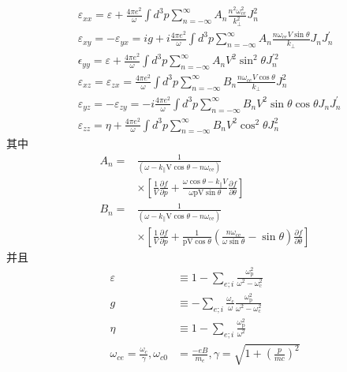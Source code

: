 \begin{subequations}\label{eq:disper}
\begin{align}
&\varepsilon_{x x} = \varepsilon+\frac{4 \pi e^{2}}{\omega} \int d^{3} p \sum_{n = -\infty}^{\infty} A_{n} \frac{n^{2} \omega_{c e}^{2}}{k_{\perp}^{2}} J_{n}^{2} \\
&\varepsilon_{x y} = -\varepsilon_{y x} = i g+i \frac{4 \pi e^{2}}{\omega} \int d^{3} p \sum_{n = -\infty}^{\infty} A_{n} \frac{n \omega_{c e} V \sin \theta}{k_{\perp}} J_{n} J_{n}^{\prime} \\
&\epsilon_{y y} = \varepsilon+\frac{4 \pi e^{2}}{\omega} \int d^{3} p \sum_{n = -\infty}^{\infty} A_{n} V^{2} \sin ^{2} \theta J_{n}^{\prime 2} \\
&\varepsilon_{x z} = \varepsilon_{z x} = \frac{4 \pi e^{2}}{\omega} \int d^{3} p \sum_{n = -\infty}^{\infty} B_{n} \frac{n \omega_{c e} V \cos \theta}{k_{\perp}} J_{n}^{2} \\
&\varepsilon_{y z} = -\varepsilon_{z y} = -i \frac{4 \pi e^{2}}{\omega} \int d^{3} p \sum_{n = -\infty}^{\infty} B_{n} V^{2} \sin \theta \cos \theta J_{n} J_{n}^{\prime} \\
&\varepsilon_{z z} = \eta+\frac{4 \pi e^{2}}{\omega} \int d^{3} p \sum_{n = -\infty}^{\infty} B_{n} V^{2} \cos ^{2} \theta J_{n}^{2}
\end{align}
\end{subequations}
\noindent	其中
\begin{equation*}
\begin{aligned}A_{n}= & \frac{1}{\left(\omega-k_{\|} \mathrm{V} \cos \theta-n \omega_{\mathrm{ce}}\right)} \\& \times\left[\frac{1}{V} \frac{\partial f}{\partial p}+\frac{\omega \cos \theta-k_{\|} V}{\omega \mathrm{pV} \sin \theta} \frac{\partial f}{\partial \theta}\right] \\B_{n}= & \frac{1}{\left(\omega-k_{\|} \mathrm{V} \cos \theta-n \omega_{\mathrm{ce}}\right)} \\& \times\left[\frac{1}{V} \frac{\partial f}{\partial p}+\frac{1}{\mathrm{pV} \cos \theta}\left(\frac{n \omega_{\mathrm{ce}}}{\omega \sin \theta}-\sin \theta\right) \frac{\partial f}{\partial \theta}\right]\end{aligned}
\end{equation*}
并且
\begin{equation*}
\begin{aligned}
\varepsilon& \equiv 1-\sum_{e ; i} \frac{\omega_{\mathrm{p}}^{2}}{\omega^{2}-\omega_{\mathrm{c}}^{2}} \\
g &\equiv-\sum_{e ; i} \frac{\omega_{\mathrm{c}}}{\omega} \frac{\omega_{\mathrm{p}}^{2}}{\omega^{2}-\omega_{\mathrm{c}}^{2}}  \\
\eta &\equiv 1-\sum_{e ; i} \frac{\omega_{\mathrm{p}}^{2}}{\omega^{2}} \\\omega_{c e} = \frac{\omega_{c}}{\gamma}, \omega_{c0} &= \frac{-e B}{m_{e}}, \gamma  = \sqrt{1+\left(\frac{p}{m c}\right)^{2}}
\end{aligned}
\end{equation*}
